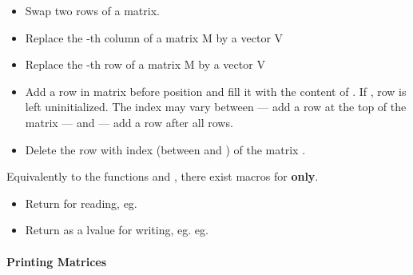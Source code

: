 \begin{itemize}
\item {}
  \sshortdescribe Swap two rows of a matrix.  

\item {}
  \sshortdescribe Replace the -th column of a matrix M by a vector V 

\item {}
  \sshortdescribe Replace the -th row of a matrix M by a vector V  

\item {}
  \sshortdescribe Add a row in matrix  before position  and fill
  it with the content of . If , row  is left
  uninitialized. The index  may vary between  --- add a row at the
  top of the matrix --- and  --- add a row after all rows.

\item {}
  \sshortdescribe Delete the row with index  (between  and
  ) of the matrix .

\end{itemize}

Equivalently to the functions  and ,
there exist macros for {\bf \PnlMat only}.
\begin{itemize}
\item {}
  \sshortdescribe Return  for reading, eg. 
  
\item {}
  \sshortdescribe Return  as a lvalue for writing, eg. eg. 
\end{itemize}


\paragraph{Printing Matrices}

